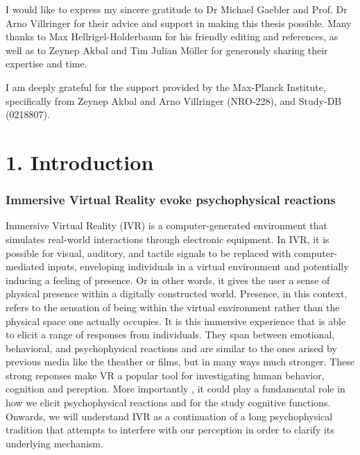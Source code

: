 \documentclass[12pt,oneside,openright]{report}
\begin{document}
\begin{adjustwidth}{1cm}{1cm}

    I would like to express my sincere gratitude to Dr Michael Gaebler and Prof. Dr Arno Villringer for their advice and support in making this thesis possible. Many thanks to Max Hellrigel-Holderbaum for his friendly editing and references, as well as to Zeynep Akbal and Tim Julian Möller for generously sharing their expertise and time.

    I am deeply grateful for the support provided by the Max-Planck Institute, specifically from Zeynep Akbal and Arno Villringer (NRO-228), and Study-DB (0218807).
    
\end{adjustwidth}

\clearpage

\section*{1. Introduction}

\subsubsection*{Immersive Virtual Reality evoke psychophysical reactions}

Immersive Virtual Reality (IVR) is a computer-generated environment that simulates real-world interactions through electronic equipment. In IVR, it is possible for visual, auditory, and tactile signals to be replaced with computer-mediated inputs, enveloping individuals in a virtual environment and potentially inducing a feeling of presence. Or in other words, it gives the user a sense of physical presence within a digitally constructed world. Presence, in this context, refers to the sensation of being within the virtual environment rather than the physical space one actually occupies. It is this immersive experience that is able to elicit a range of responses from individuals. They span between emotional, behavioral, and psychophysical reactions \parencite{SanchezVives2005FromPT} and are similar to the ones arised by previous media like the theather or films, but in many ways much stronger. These strong reponses make VR a popular tool for investigating human behavior, cognition and pereption. More importantly , it could play a fundamental role in how we elicit psychophysical reactions and for the study cognitive functions. Onwards, we will understand IVR as a continuation of a long psychophysical tradition that attempts to interfere with our perception in order to clarify its underlying mechanism. 
\end{document}
